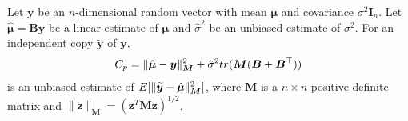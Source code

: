 \documentclass[10pt,a4paper]{amsart}
\newcommand{\mtx}[1]{\bm{#1}}
\newcommand{\vct}[1]{\bm{#1}}
\begin{document}
\begin{lemma}\label{lem_Cp}
	Let $\vct{y}$ be an $n$-dimensional random vector with mean $\vct{\mu}$ and covariance $\sigma^2 \mtx{I}_n$.
	Let $\hat{\vct{\mu}}=\mtx{B} \vct{y}$ be a linear estimate of $\vct{\mu}$ and $\hat{\sigma}^2$ be an unbiased estimate of $\sigma^2$.
	For an independent copy $\widetilde{\vct{y}}$ of $\vct{y}$, 
	\begin{align*}
		C_p = \| \hat{\vct{\mu}}-\vct{y} \|_{\mtx{M}}^2 + \hat{\sigma}^2 {\rm tr} (\mtx{M} (\mtx{B}+\mtx{B}^{\top}))
	\end{align*}
	is an unbiased estimate of ${\rm E} [ \| \widetilde{\vct{y}}-\hat{\vct{\mu}} \|_{\mtx{M}}^2]$, where $\mtx{M}$ is a $n \times n$ positive definite matrix and $\| \vct{z} \|_{\mtx{M}} = (\vct{z}^T \mtx{M} \vct{z})^{1/2}$.
\end{lemma}
\end{document}
